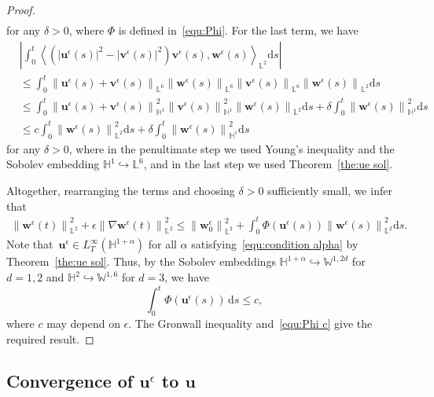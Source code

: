 \documentclass[11pt,reqno]{amsart}
\theoremstyle{definition}
\numberwithin{equation}{section}
\newcommand{\bff}{\boldsymbol}
\newcommand{\bb}{\mathbb}
\newcommand{\ds}{\mathrm{d}s}
\newcommand{\nn}{\nonumber}
\newcommand{\norm}[2]{\left\|{#1}\right\|_{#2}}
\newcommand{\inpro}[2]{\left\langle#1,#2\right\rangle}
\begin{document}
\begin{proof}
\begin{align*}
	\end{align*}
	for any $\delta>0$, where $\Phi$ is defined in~\eqref{equ:Phi}.
	For the last term, we have
	\begin{align}\label{equ:ue ve w}
		&\left| \int_0^t \inpro{(|\bff{u}^\epsilon(s)|^2-|\bff{v}^\epsilon(s)|^2)\bff{v}^\epsilon(s)}{\bff{w}^\epsilon(s)}_{\bb{L}^2} \ds \right| 
		\nn\\
		&\leq
		\int_0^t \norm{\bff{u}^\epsilon(s)+\bff{v}^\epsilon(s)}{\bb{L}^6}
		\norm{\bff{w}^\epsilon(s)}{\bb{L}^6}
		\norm{\bff{v}^\epsilon(s)}{\bb{L}^6}
		\norm{\bff{w}^\epsilon(s)}{\bb{L}^2} \ds 
		\nn \\
		&\leq
		\int_0^t \norm{\bff{u}^\epsilon(s)+\bff{v}^\epsilon(s)}{\bb{H}^1}^2
		\norm{\bff{v}^\epsilon(s)}{\bb{H}^1}^2
		\norm{\bff{w}^\epsilon(s)}{\bb{L}^2} \ds 
		+
		\delta \int_0^t \norm{\bff{w}^\epsilon(s)}{\bb{H}^1}^2 \ds 
		\nn \\
		&\leq
		c \int_0^t \norm{\bff{w}^\epsilon(s)}{\bb{L}^2}^2 \ds 
		+
		\delta \int_0^t \norm{\bff{w}^\epsilon(s)}{\bb{H}^1}^2 \ds 
	\end{align}
	for any $\delta>0$, where in the penultimate step we used Young's
	inequality and the Sobolev embedding $\bb{H}^1\hookrightarrow \bb{L}^6$, and
	in the last step we used Theorem~\ref{the:ue sol}. 
	
	Altogether, rearranging the terms and choosing $\delta>0$ sufficiently small, we infer that
	\begin{align*}
		\norm{\bff{w}^\epsilon(t)}{\bb{L}^2}^2
		+
		\epsilon \norm{\nabla\bff{w}^\epsilon(t)}{\bb{L}^2}^2
		\leq
		\norm{\bff{w}_0^\epsilon}{\bb{L}^2}^2
		+
		\int_0^t \Phi(\bff{u}^\epsilon(s)) \norm{\bff{w}^\epsilon(s)}{\bb{L}^2}^2 \ds.
	\end{align*}
	Note that~$\bff{u}^\epsilon\in L^\infty_T(\bb{H}^{1+\alpha})$ for all $\alpha$ satisfying~\eqref{equ:condition alpha} by
	Theorem~\ref{the:ue sol}. Thus, by the Sobolev embeddings $\bb{H}^{1+\alpha}\hookrightarrow \bb{W}^{1,2d}$ for $d=1,2$ and $\bb{H}^2\hookrightarrow \bb{W}^{1,6}$ for $d=3$, we have
	\begin{equation}\label{equ:Phi c}
		\int_0^t \Phi(\bff{u}^\epsilon(s))\,\ds \le c,
	\end{equation}
	where $c$ may depend on $\epsilon$.
	 The Gronwall inequality and~\eqref{equ:Phi c} {give the} required result.
\end{proof}




\subsection{Convergence of $\bff{u}^\epsilon$ to $\bff{u}$} \label{sec:conver}
\end{document}
